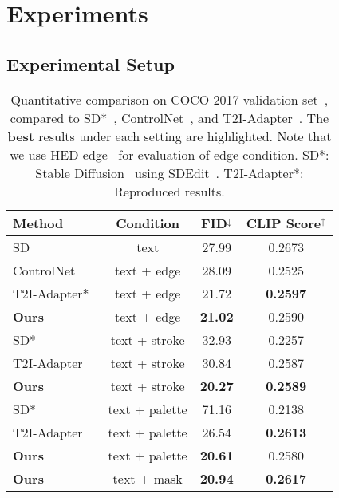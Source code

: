 \documentclass{article}
\begin{document}
\section{Experiments}
\label{section:experiments}

\subsection{Experimental Setup}

\begin{table}[t!]
  \centering
  \caption{Quantitative comparison on COCO 2017 validation set~\cite{lin2014microsoft}, compared to SD*~\cite{rombach2022high}, ControlNet~\cite{zhang2023adding}, and T2I-Adapter~\cite{mou2023t2i}. The \textbf{best} results under each setting are highlighted. Note that we use HED edge~\cite{xie2015holistically} for evaluation of edge condition. SD*: Stable Diffusion~\cite{rombach2022high} using SDEdit~\cite{meng2021sdedit}. T2I-Adapter*: Reproduced results.}
\begin{tabular}{lccc}
   \toprule
   Method & Condition & FID$^\downarrow$ & CLIP Score$^\uparrow$\\
   \midrule
   SD~\cite{rombach2022high} & text & 27.99 & 0.2673 \\
   \midrule
ControlNet~\cite{zhang2023adding} & text + edge & 28.09 & 0.2525 \\
   T2I-Adapter*~\cite{mou2023t2i} & text + edge & 21.72 & \textbf{0.2597} \\
   \textbf{Ours} & text + edge & \textbf{21.02} & 0.2590 \\
   \midrule
   SD*~\cite{rombach2022high} & text + stroke & 32.93 & 0.2257 \\
   T2I-Adapter~\cite{mou2023t2i} & text + stroke & 30.84 & 0.2587 \\
   \textbf{Ours} & text + stroke & \textbf{20.27} & \textbf{0.2589} \\
   \midrule
   SD*~\cite{rombach2022high} & text + palette & 71.16 & 0.2138 \\
   T2I-Adapter~\cite{mou2023t2i} & text + palette & 26.54 & \textbf{0.2613} \\
   \textbf{Ours} & text + palette & \textbf{20.61} & 0.2580 \\
   \midrule
   \textbf{Ours} & text + mask & \textbf{20.94} & \textbf{0.2617} \\
   \bottomrule
\end{tabular}
\vspace{-1.5em}
\label{table:quantitative comparison}
\end{table}
\end{document}
